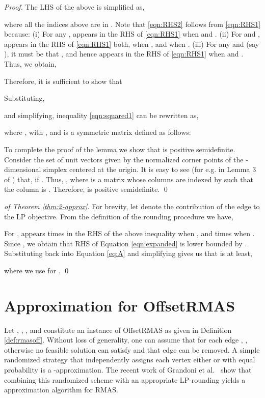 \documentclass[oribibl]{llncs}
\newcommand{\rmas}{{\sc RMAS}\xspace}
\newcommand{\rmasoff}{{\sc OffsetRMAS}\xspace}
\begin{document}
\begin{proof} The LHS of the above is simplified as,

where all the indices above are in . Note that \eqref{eqn:RHS2}
follows from \eqref{eqn:RHS1} because: \newline
      (i) For any ,  appears in
      the RHS of \eqref{eqn:RHS1} when  and .\newline
      (ii) For  and ,
       appears in the RHS of \eqref{eqn:RHS1} both,
      when , and when .\newline
      (iii) For any  and  (say
      ), it must be that , and hence
       appears in the RHS of \eqref{eqn:RHS1}
      when  and .\newline
      Thus, we obtain,
      
Therefore, it is sufficient to show that

Substituting, 

and simplifying, inequality \eqref{eqn:squared1} can be rewritten as,

  where ,
   with 
  , and  
  is a symmetric matrix defined as follows: 

To complete the proof of the lemma we show that  is positive
semidefinite. Consider the set of unit vectors
 given by the normalized corner
points of the -dimensional simplex centered at the origin. 
It is easy to see
(for e.g. in Lemma 3 of \cite{frieze1997improved}) that,  if . 
Thus, , where  is a matrix whose columns are
indexed by  such that 
the  column is . 
Therefore,  is positive 
semidefinite.
\qed
\end{proof}
\begin{proof}[of Theorem \ref{thm:2-approx}]
For brevity, let  denote the contribution
of the edge  to the LP objective. From the definition of the
rounding procedure we have, 

For ,  appears  times in the RHS of the above
inequality when , and  times when . Since , we obtain that RHS of Equation \eqref{eqn:expanded} is 
lower bounded by . Substituting back into Equation
\eqref{eq:A} and simplifying gives us that  is at least,

where we use  for .
\qed
\end{proof}

\section{Approximation for \rmasoff}
\label{sec:generalizations}
Let , , , and  
constitute an instance of \rmasoff
as given in Definition \ref{def:rmasoff}.
Without loss of generality, one can assume that for each edge ,  , otherwise
no feasible solution can satisfy  and that edge can be removed. 
A simple randomized
strategy that independently assigns each vertex  either 
or 
with equal probability is a -approximation. The
recent work of Grandoni et al.~\cite{grandoni2015lp} show that
combining this randomized scheme with an appropriate LP-rounding
yields a  approximation algorithm for
\rmas.
\end{document}
